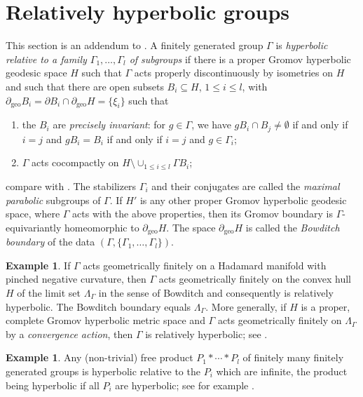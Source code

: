 \documentclass[12pt,a4paper]{amsart}
\numberwithin{equation}{section}
\theoremstyle{definition}
\newtheorem{exa}[equation]{Example}
\DeclareMathOperator{\geo}{geo}
\begin{document}
\section{Relatively hyperbolic groups}\label{subrelhyp}
This section is an addendum to \cite{Nan}.
A finitely generated group $\Gamma$ is \emph{hyperbolic relative to a family $\Gamma_1,\dots,\Gamma_l$ of subgroups} if there is a proper Gromov hyperbolic geodesic space $H$ such that $\Gamma$ acts properly discontinuously by isometries on $H$ and such that there are open subsets $B_i\subseteq H$, $1\le i\le l$, with $\partial_{\geo}B_i=\partial B_i\cap\partial_{\geo}H=\{\xi_i\}$ such that
\begin{enumerate}
    \item the $B_i$ are \emph{precisely invariant}:
    for $g\in\Gamma$, we have $gB_i\cap B_j\ne\emptyset$ if and only if $i=j$ and $gB_i= B_i$ if and only if $i=j$ and $g\in\Gamma_i$;
    \item $\Gamma$ acts cocompactly on $H \setminus \cup_{1\le i\le l}\Gamma B_i$;
\end{enumerate}
compare with \cite{Bo1,GroMan}.
The stabilizers $\Gamma_{i}$ and their conjugates are called the \emph{maximal parabolic} subgroups of $\Gamma$.
If $H'$ is any other proper Gromov hyperbolic geodesic space, where $\Gamma$ acts with the above properties, then its Gromov boundary is $\Gamma$-equivariantly homeomorphic to $\partial_{\geo}H$. 
The space $\partial_{\geo}H$ is called the \emph{Bowditch boundary} of the data $(\Gamma,\{\Gamma_{1},\dots,\Gamma_{l}\})$.

\begin{exa}
If $\Gamma$ acts geometrically finitely on a Hadamard manifold with pinched negative curvature, then $\Gamma$ acts geometrically finitely on the convex hull $H$ of the limit set $\Lambda_\Gamma$ in the sense of Bowditch \cite{Bo1} and consequently is relatively hyperbolic.
The Bowditch boundary equals $\Lambda_\Gamma$. More generally, if $H$ is a proper, complete Gromov hyperbolic metric space and $\Gamma$ acts geometrically finitely on $\Lambda_\Gamma$ by a \textit{convergence action}, then $\Gamma$ is relatively hyperbolic; see \cite{Y}.
\end{exa}

\begin{exa}
Any (non-trivial) free product $P_1\ast\cdots\ast P_l$ of finitely many finitely generated groups is hyperbolic relative to the $P_i$ which are infinite, the product being hyperbolic if all $P_i$ are hyperbolic; see for example \cite{Osin}.
\end{exa}
\end{document}

